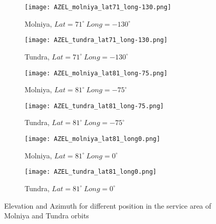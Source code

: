 	\begin{figure}[!htbp]\ContinuedFloat
	\begin{subfigure}{.5\textwidth}
	\centering
	\texttt{[image: AZEL\_molniya\_lat71\_long-130.png]}
	\caption{Molniya, $Lat = 71^\circ ~ Long = -130^\circ$}
	\end{subfigure}
	\begin{subfigure}{.5\textwidth}
	\centering
	\texttt{[image: AZEL\_tundra\_lat71\_long-130.png]}
	\caption{Tundra, $Lat = 71^\circ ~ Long = -130^\circ$}
	\end{subfigure}
	\vspace{0.5cm}
	\begin{subfigure}{.5\textwidth}
	\centering
	\texttt{[image: AZEL\_molniya\_lat81\_long-75.png]}
	\caption{Molniya, $Lat = 81^\circ ~ Long = -75^\circ$}
	\end{subfigure}
	\begin{subfigure}{.5\textwidth}
	\centering
	\texttt{[image: AZEL\_tundra\_lat81\_long-75.png]}
	\caption{Tundra, $Lat = 81^\circ ~ Long = -75^\circ$}
	\end{subfigure}
	\vspace{0.5cm}
	\begin{subfigure}{.5\textwidth}
	\centering
	\texttt{[image: AZEL\_molniya\_lat81\_long0.png]}
	\caption{Molniya, $Lat = 81^\circ ~ Long = 0^\circ$}
	\end{subfigure}
	\begin{subfigure}{.5\textwidth}
	\centering
	\texttt{[image: AZEL\_tundra\_lat81\_long0.png]}
	\caption{Tundra, $Lat = 81^\circ ~ Long = 0^\circ$}
	\end{subfigure}
	\caption{Elevation and Azimuth for different position in the service area of Molniya and Tundra orbits}
	\label{fig:elevation_multi}
\end{figure}

\newpage
